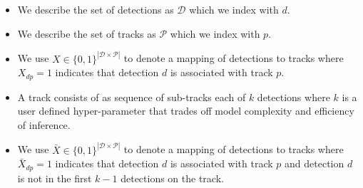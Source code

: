\documentclass{article}
\begin{document}
\begin{itemize}
\item
We describe the set of detections as $\mathcal{D}$ which we index with $d$.  
\item 
We describe the set of tracks as $\mathcal{P}$ which we index with $p$.  
\item 
We use $X \in \{0,1\}^{|\mathcal{D}\times \mathcal{P}|}$ to denote a mapping of detections to tracks where $X_{dp}=1$ indicates that detection $d$ is associated with track $p$.  
\item 
A track consists of as sequence of sub-tracks each of $k$ detections where $k$ is a user defined hyper-parameter that trades off model complexity and efficiency of inference. 
\item 
 We use $\bar{X} \in \{0,1\}^{|\mathcal{D}\times \mathcal{P}|}$ to denote a mapping of detections to tracks where $\bar{X}_{dp}=1$ indicates that detection $d$ is associated with track $p$ and detection $d$ is not in the first $k-1$ detections  on the track.

\end{itemize}
\end{document}
